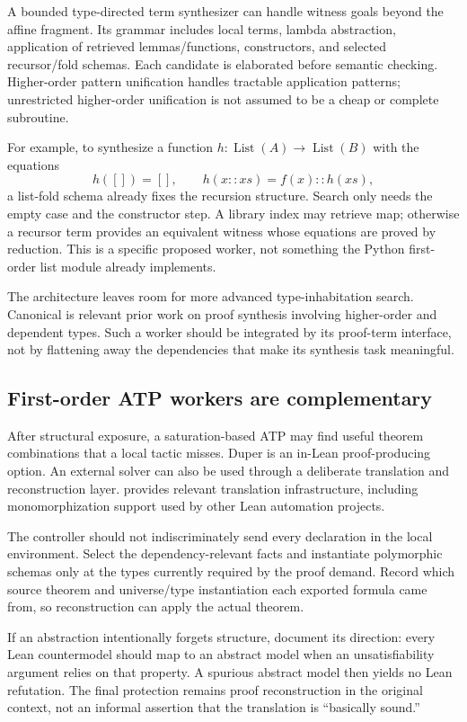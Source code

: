A bounded type-directed term synthesizer can handle witness goals beyond the
affine fragment. Its grammar includes local terms, lambda abstraction,
application of retrieved lemmas/functions, constructors, and selected
recursor/fold schemas. Each candidate is elaborated before semantic checking.
Higher-order pattern unification handles tractable application patterns;
unrestricted higher-order unification is not assumed to be a cheap or complete
subroutine.

For example, to synthesize a function $h:\operatorname{List}(A)\to
\operatorname{List}(B)$ with the equations
\[
h([])=[],\qquad h(x::xs)=f(x)::h(xs),
\]
a list-fold schema already fixes the recursion structure. Search only needs
the empty case and the constructor step. A library index may retrieve map;
otherwise a recursor term provides an equivalent witness whose equations are
proved by reduction. This is a specific proposed worker, not something the
Python first-order list module already implements.

The architecture leaves room for more advanced type-inhabitation search.
Canonical is relevant prior work on proof synthesis involving higher-order
and dependent types.\cite{canonical} Such a worker should be integrated by
its proof-term interface, not by flattening away the dependencies that make
its synthesis task meaningful.

\subsection{First-order ATP workers are complementary}

After structural exposure, a saturation-based ATP may find useful theorem
combinations that a local tactic misses. Duper is an in-Lean proof-producing
option.\cite{duper} An external solver can also be used through a deliberate
translation and reconstruction layer.  provides relevant
translation infrastructure, including monomorphization support used by other
Lean automation projects.\cite{leanauto,leansmt}

The controller should not indiscriminately send every declaration in the
local environment. Select the dependency-relevant facts and instantiate
polymorphic schemas only at the types currently required by the proof demand.
Record which source theorem and universe/type instantiation each exported
formula came from, so reconstruction can apply the actual theorem.

If an abstraction intentionally forgets structure, document its direction:
every Lean countermodel should map to an abstract model when an unsatisfiability
argument relies on that property. A spurious abstract model then yields no
Lean refutation. The final protection remains proof reconstruction in the
original context, not an informal assertion that the translation is
``basically sound.''

